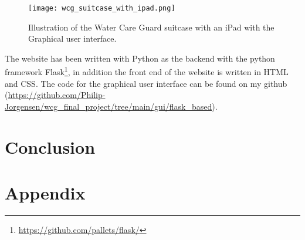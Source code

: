 \documentclass{article}
\begin{document}
\begin{figure}[H]
    \centering
    \texttt{[image: wcg\_suitcase\_with\_ipad.png]}
    \caption{Illustration of the Water Care Guard suitcase with an iPad with the Graphical user interface.}
    \label{fig:wcg_with_ipad}
\end{figure}

\medskip

The website has been written with Python as the backend with the python framework Flask\footnote{\url{https://github.com/pallets/flask/}}, in addition the front end of the website is written in HTML and CSS.
The code for the graphical user interface can be found on my github (\url{https://github.com/Philip-Jorgensen/wcg_final_project/tree/main/gui/flask_based}).


\newpage
\section{Conclusion}

\newpage

\renewcommand*{\UrlFont}{\rmfamily}
\printbibliography[heading=bibintoc, title={Bibliography}]

\section{Appendix}
\end{document}
